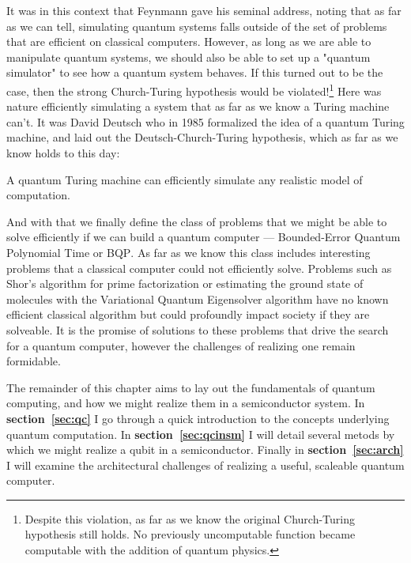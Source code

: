 It was in this context that Feynmann gave his seminal address, noting that as far as we can tell, simulating
quantum systems falls outside of the set of problems that are efficient on classical computers\cite{Feynman1982}. 
However, as long as we are able to manipulate quantum systems, we should also be able to set up a "quantum
simulator" to see how a quantum system behaves. If this turned out to be the case, then the strong 
Church-Turing hypothesis would be violated!\footnote{Despite this violation, as far as we know the original
Church-Turing hypothesis still holds. No previously uncomputable function became computable with the addition
of quantum physics.} Here was nature efficiently simulating a system that as far as we know a Turing machine 
can't. It was David Deutsch who in 1985 formalized the idea of a quantum Turing machine\cite{doi:10.1098/rspa.1985.0070}, 
and laid out the Deutsch-Church-Turing hypothesis, which as far as we know holds to this day:

\begin{displayquote}
  A quantum Turing machine can efficiently simulate any realistic model of computation.
\end{displayquote}

And with that we finally define the class of problems that we might be able to solve efficiently if we 
can build a quantum computer --- Bounded-Error Quantum Polynomial Time or \textsc{BQP}. As far as we know
this class includes interesting problems that a classical computer could not efficiently solve. Problems
such as Shor's algorithm for prime factorization\cite{Shor} or estimating the ground state of molecules with
the Variational Quantum Eigensolver algorithm\cite{ncomms5213} have no known efficient classical algorithm
but could profoundly impact society if they are solveable. It is the promise of solutions to these problems
that drive the search for a quantum computer, however the challenges of realizing one remain formidable. 

The remainder of this chapter aims to lay out the fundamentals of quantum computing, and how we might realize
them in a semiconductor system. In \textbf{section~\ref{sec:qc}} I go through a quick introduction to the concepts
underlying quantum computation. In \textbf{section~\ref{sec:qcinsm}} I will detail several metods by which we might
realize a qubit in a semiconductor. Finally in \textbf{section~\ref{sec:arch}} I will examine the architectural
challenges of realizing a useful, scaleable quantum computer.

